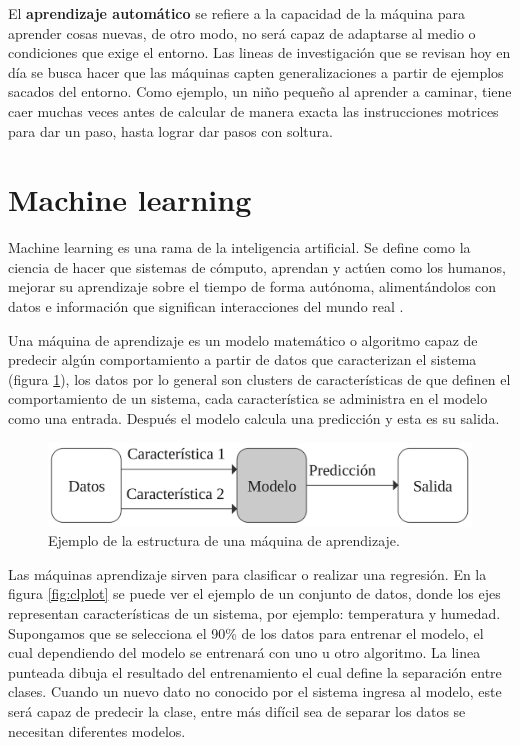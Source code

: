 \documentclass[twoside,spanish,ESP,MSc]{plantillaLabUPV}
\theoremstyle{definition}
\begin{document}
El \textbf{aprendizaje automático} se refiere a la capacidad de la máquina para aprender cosas nuevas, de otro modo, no será capaz de adaptarse al medio o condiciones que exige el entorno. Las lineas de investigación que se revisan hoy en día se busca hacer que las máquinas capten generalizaciones a partir de ejemplos sacados del entorno. Como ejemplo, un niño pequeño al aprender a caminar, tiene caer muchas veces antes de calcular de manera exacta las instrucciones motrices para dar un paso, hasta lograr dar pasos con soltura.


\section{Machine learning}

Machine learning es una rama de la inteligencia artificial. Se define como la ciencia de hacer que sistemas de cómputo, aprendan y actúen como los humanos, mejorar su aprendizaje sobre el tiempo de forma autónoma, alimentándolos con datos e información que significan interacciones del mundo real \cite{supervisadobook}.

Una máquina de aprendizaje es un modelo matemático o algoritmo capaz de predecir algún comportamiento a partir de datos que caracterizan el sistema (figura \ref{fml}), los datos por lo general son clusters de características de que definen el comportamiento de un sistema, cada característica se administra en el modelo como una entrada. Después el modelo calcula una predicción y esta es su salida.

\begin{figure}[!tbh] 
	\centering 
		\includegraphics[scale=.30]{ima_mc/flujoml} 
	\caption{Ejemplo de la estructura de una máquina de aprendizaje.} 
	\label{fml} 
\end{figure}

Las máquinas aprendizaje sirven para clasificar o realizar una regresión. En la figura \ref{fig:clplot} se puede ver el ejemplo de un conjunto de datos, donde los ejes representan características de un sistema, por ejemplo: temperatura y humedad. Supongamos que se selecciona el 90\% de los datos para entrenar el modelo, el cual dependiendo del modelo se entrenará con uno u otro algoritmo.
La linea punteada dibuja el resultado del entrenamiento el cual define la separación entre clases. Cuando un nuevo dato no conocido por el sistema ingresa al modelo, este será capaz de predecir la clase, entre más difícil sea de separar los datos se necesitan diferentes modelos.
\end{document}
